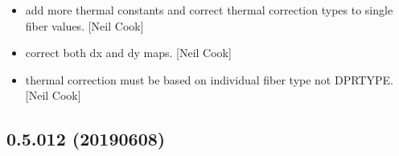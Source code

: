 \documentclass[a4paper,10pt,english]{report}
\begin{document}
\begin{itemize}
\item {} 
 \sphinxhyphen{} add more thermal constants and correct
thermal correction types to single fiber values. {[}Neil Cook{]}

\item {} 
 \sphinxhyphen{} correct both dx and dy maps. {[}Neil Cook{]}

\item {} 
 \sphinxhyphen{} thermal correction must be based on
individual fiber type not DPRTYPE. {[}Neil Cook{]}

\end{itemize}


\subsection{0.5.012 (2019\sphinxhyphen{}06\sphinxhyphen{}08)}
\end{document}
